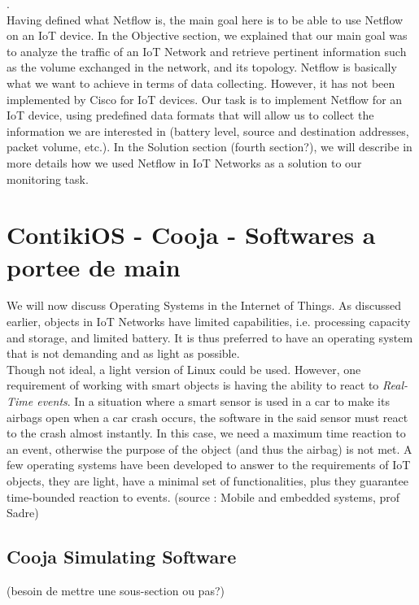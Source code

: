 .\\

Having defined what Netflow is, the main goal here is to be able to use Netflow on an IoT device. In the Objective section, we explained that our main goal was to analyze the traffic of an IoT Network and retrieve pertinent information such as the volume exchanged in the network, and its topology. Netflow is basically what we want to achieve in terms of data collecting. However, it has not been implemented by Cisco for IoT devices. Our task is to implement Netflow for an IoT device, using predefined data formats that will allow us to collect the information we are interested in (battery level, source and destination addresses, packet volume, etc.). In the Solution section (fourth section?), we will describe in more details how we used Netflow in IoT Networks as a solution to our monitoring task.

\section{ContikiOS - Cooja - Softwares a portee de main}

We will now discuss Operating Systems in the Internet of Things. As discussed earlier, objects in IoT Networks have limited capabilities, i.e. processing capacity and storage, and limited battery. It is thus preferred to have an operating system that is not demanding and as light as possible. \\

Though not ideal, a light version of Linux could be used. However, one requirement of working with smart objects is having the ability to react to \textit{Real-Time events}. In a situation where a smart sensor is used in a car to make its airbags open when a car crash occurs, the software in the said sensor must react to the crash almost instantly. In this case, we need a maximum time reaction to an event, otherwise the purpose of the object (and thus the airbag) is not met. A few operating systems have been developed to answer to the requirements of IoT objects, they are light, have a minimal set of functionalities, plus they guarantee time-bounded reaction to events. (source : Mobile and embedded systems, prof Sadre)\\

\subsection{Cooja Simulating Software}
(besoin de mettre une sous-section ou pas?)

